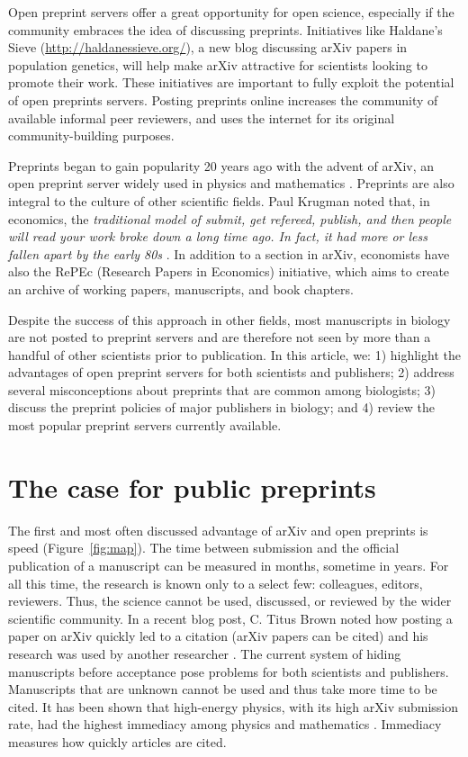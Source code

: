 \documentclass[letterpaper,twocolumn,superscriptaddress,showkeys,longbibliography]{revtex4-1}
\begin{document}
Open preprint servers offer a great opportunity for open science, especially if
the community embraces the idea of discussing preprints. Initiatives like
Haldane's Sieve (\href{http://haldanessieve.org/}{http://haldanessieve.org/}), a
new blog discussing arXiv papers in population genetics, will help make arXiv
attractive for scientists looking to promote their work. These initiatives are
important to fully exploit the potential of open preprints servers. Posting
preprints online increases the community of available informal peer reviewers,
and uses the internet for its original community-building purposes.

Preprints began to gain popularity 20 years ago with the advent of arXiv, an open
preprint server widely used in physics and mathematics \cite{gin11}. Preprints
are also integral to the culture of other scientific fields.  Paul Krugman noted
that, in economics, the \emph{traditional model of submit, get refereed,
publish, and then people will read your work broke down a long time ago. In
fact, it had more or less fallen apart by the early 80s} \cite{kru12}. In
addition to a section in arXiv, economists have also the RePEc (Research Papers
in Economics) initiative, which aims to create an archive of working papers,
manuscripts, and book chapters.

Despite the success of this approach in other fields, most manuscripts in
biology are not posted to preprint servers and are therefore not seen by more
than a handful of other scientists prior to publication. In this article, we: 1)
highlight the advantages of open preprint servers for both scientists and
publishers; 2) address several misconceptions about preprints that are common
among biologists; 3) discuss the preprint policies of major publishers in
biology; and 4) review the most popular preprint servers currently available.

\section{The case for public preprints}

The first and most often discussed advantage of arXiv and open preprints is
speed (Figure~\ref{fig:map}). The time between submission and the official
publication of a manuscript can be measured in months, sometime in years. For
all this time, the research is known only to a select few: colleagues, editors,
reviewers. Thus, the science cannot be used, discussed, or reviewed by the wider
scientific community. In a recent blog post, C. Titus Brown noted how posting a
paper on arXiv quickly led to a citation (arXiv papers can be cited) and his
research was used by another researcher \cite{bro12}. The current system of
hiding manuscripts before acceptance pose problems for both scientists and
publishers. Manuscripts that are unknown cannot be used and thus take more time
to be cited. It has been shown that high-energy physics, with its high arXiv
submission rate, had the highest immediacy among physics and mathematics
\cite{pra05}. Immediacy measures how quickly articles are cited. 
\end{document}

